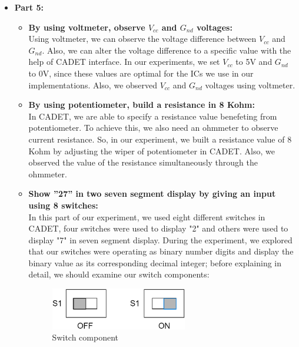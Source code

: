 \documentclass[pdftex,12pt,a4paper]{article}
\begin{document}
\begin{itemize}
    \item \textbf{Part 5:}
    \begin{itemize}
        \item \textbf{By using voltmeter, observe $V_{cc}$ and $G_{nd}$ voltages:}\\
    Using voltmeter, we can observe the voltage difference between $V_{cc}$ and $G_{nd}$. Also, we can alter the voltage difference to a specific value with the help of CADET interface. In our experiments, we set $V_{cc}$ to 5V and $G_{nd}$ to 0V, since these values are optimal for the ICs we use in our implementations. Also, we observed $V_{cc}$ and $G_{nd}$ voltages using voltmeter.
    \end{itemize}
    \begin{itemize}
        \item \textbf{By using potentiometer, build a resistance in 8 Kohm:}\\
    In CADET, we are able to specify a resistance value benefeting from potentiometer. To achieve this, we also need an ohmmeter to observe current resistance. So, in our experiment, we built a resistance value of 8 Kohm by adjusting the wiper of potentiometer in CADET. Also, we observed the value of the resistance simultaneously through the ohmmeter.
    \end{itemize}
    \begin{itemize}
        \item \textbf{Show ”27” in two seven segment display by giving an input using 8 switches:}\\
    In this part of our experiment, we used eight different switches in CADET, four switches were used to display "2" and others were used to display "7" in seven segment display. During the experiment, we explored that our switches were operating as binary number digits and display the binary value as its corresponding decimal integer; before explaining in detail, we should examine our switch components:\\
    \begin{figure}[H]
    \centering
        \includegraphics[width=0.6\textwidth]{switch.png}	
        \caption{Switch component}
        

\end{figure}
\end{itemize}
\end{itemize}
\end{document}
